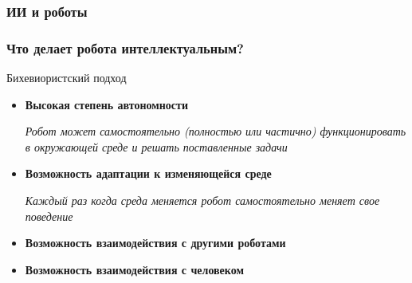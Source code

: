\documentclass[12pt]{beamer}
\begin{document}
\begin{frame}
\frametitle{ИИ и роботы}
\end{frame}

\begin{frame}
	\frametitle{Что делает робота интеллектуальным?}
	Бихевиористский подход
	\begin{itemize}
		\item \textbf{Высокая степень автономности}
		
		\textit{Робот может самостоятельно (полностью или частично) функционировать в окружающей среде и решать поставленные задачи}
		
		\item \textbf{Возможность адаптации к изменяющейся среде}
		
		\textit{Каждый раз когда среда меняется робот самостоятельно меняет свое поведение}
		
		\item \textbf{Возможность взаимодействия с другими роботами}
		
		\item \textbf{Возможность взаимодействия с человеком}
	\end{itemize}
\end{frame}
\end{document}
